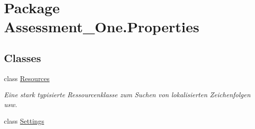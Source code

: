 \hypertarget{namespace_assessment___one_1_1_properties}{
\section{Package Assessment\_\-One.Properties}
\label{namespace_assessment___one_1_1_properties}
}
\subsection*{Classes}
\begin{DoxyCompactItemize}
\item 
class \hyperlink{class_assessment___one_1_1_properties_1_1_resources}{Resources}
\begin{DoxyCompactList}\small\item\em Eine stark typisierte Ressourcenklasse zum Suchen von lokalisierten Zeichenfolgen usw. \item\end{DoxyCompactList}\item 
class \hyperlink{class_assessment___one_1_1_properties_1_1_settings}{Settings}
\end{DoxyCompactItemize}
